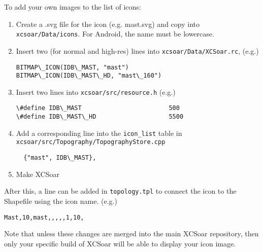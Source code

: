 To add your own images to the list of icons:
\begin{enumerate}
\item Create a .svg file for the icon (e.g. mast.svg) and copy into \texttt{xcsoar/Data/icons}. For Android, the name must be lowercase.
\item Insert two (for normal and high-res) lines into \texttt{xcsoar/Data/XCSoar.rc},  (e.g.)
\begin{verbatim}
BITMAP\_ICON(IDB\_MAST, "mast")
BITMAP\_ICON(IDB\_MAST\_HD, "mast\_160")
\end{verbatim}
\item Insert two lines into \texttt{xcsoar/src/resource.h} (e.g.)
\begin{verbatim}
\#define IDB\_MAST                        500
\#define IDB\_MAST\_HD                    5500
\end{verbatim}
\item Add a corresponding line into the \texttt{icon\_list} table in \texttt{xcsoar/src/Topography/TopographyStore.cpp}
\begin{verbatim}
  {"mast", IDB\_MAST},
\end{verbatim}
\item Make XCSoar
\end{enumerate} 
After this, a line can be added in \texttt{topology.tpl} to connect the icon to the Shapefile using the icon name. (e.g.)
\begin{verbatim}
Mast,10,mast,,,,,1,10,
\end{verbatim}

Note that unless these changes are merged into the main XCSoar repository, then only your specific build of XCSoar will be able to 
display your icon image.
